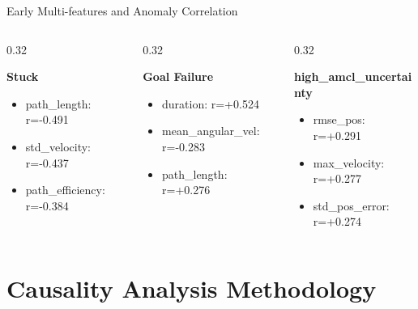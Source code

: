 \documentclass[aspectratio=169, 11pt]{beamer}
\begin{document}
\begin{frame}{Early Multi-features and Anomaly Correlation}
  \begin{columns}[T]
    \begin{column}{0.32\textwidth}
      \begin{block}{\textbf{Stuck}}
        \footnotesize
        \begin{itemize}
          \item path\_length: r=-0.491 
          \item std\_velocity: r=-0.437 
          \item path\_efficiency: r=-0.384 
        \end{itemize}
      \end{block}
    \end{column}
    
    \begin{column}{0.32\textwidth}
      \begin{block}{\textbf{Goal Failure}}
        \footnotesize
        \begin{itemize}
          \item duration: r=+0.524 
          \item mean\_angular\_vel: r=-0.283 
          \item path\_length: r=+0.276 
        \end{itemize}
      \end{block}
    \end{column}
    
    \begin{column}{0.32\textwidth}
      \begin{block}{\textbf{high\_amcl\_uncertainty}}
        \footnotesize
        \begin{itemize}
          \item rmse\_pos: r=+0.291 
          \item max\_velocity: r=+0.277 
          \item std\_pos\_error: r=+0.274 
        \end{itemize}
      \end{block}
    \end{column}
  \end{columns}
\end{frame}

\section{Causality Analysis Methodology}
\end{document}
